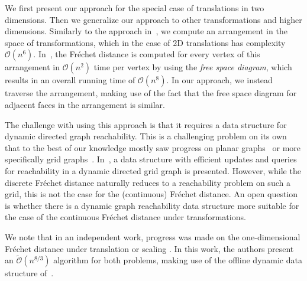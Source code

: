 \documentclass[thm-restate]{lipics-v2021}
\theoremstyle{remark}
\newcommand{\Oh}{\mathcal{O}}
\newcommand{\tOh}{\tilde{\mathcal{O}}}
\begin{document}
We first present our approach for the special case of translations in two dimensions. Then we generalize our approach to other transformations and higher dimensions. Similarly to the approach  in~\cite{altMatchingPolygonalCurves2001}, we compute an arrangement in the space of transformations, which in the case of 2D translations has complexity $\Oh(n^6)$. In~\cite{altMatchingPolygonalCurves2001}, the Fr\'echet distance is computed for every vertex of this arrangement in $\Oh(n^2)$ time per vertex by using the \emph{free space diagram}, which results in an overall running time of $\Oh(n^8)$. In our approach, we instead traverse the arrangement, making use of the fact that the free space diagram for adjacent faces in the arrangement is similar.

The challenge with using this approach is that it requires a data structure for dynamic directed graph reachability.
This is a challenging problem on its own that to the best of our knowledge mostly saw progress on planar graphs~\cite{DBLP:conf/esa/DiksS07,karczmarz_et_al:LIPIcs.ICALP.2024.95,DBLP:conf/esa/Subramanian93} or more specifically grid graphs~\cite{AvrahamKS15,bringmannFrechetDistanceTranslation2021}.
In~\cite{bringmannFrechetDistanceTranslation2021}, a data structure with efficient updates and queries for reachability in a dynamic directed grid graph is presented. However, while the discrete Fr\'echet distance naturally reduces to a reachability problem on such a grid, this is not the case for the (continuous) Fr\'echet distance. An open question is whether there is a dynamic graph reachability data structure more suitable for the case of the continuous Fr\'echet distance under transformations.

We note that in an independent work, progress was made on the one-dimensional Fréchet distance under translation or scaling \cite{BCDKNR25}. In this work, the authors present an $\tOh(n^{8/3})$ algorithm for both problems, making use of the offline dynamic data structure of~\cite{bringmannFrechetDistanceTranslation2021}.
\end{document}
